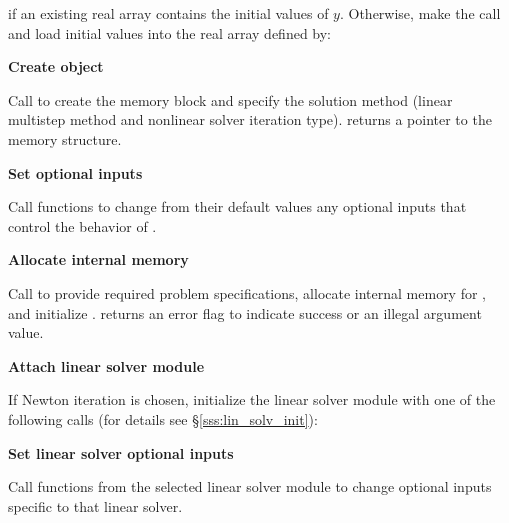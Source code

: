 \begin{Steps}
  {\s} 

  {\p} 

  if an existing real array  contains the initial values of $y$.  
  Otherwise, make the call  and load 
  initial values into the real array defined by:

  {\s} 

  {\p} 
  
\item\label{i:cvode_create} 
  {\bf Create {\cvode} object}

  Call  
  to create the {\cvode} memory block and specify the solution method
  (linear multistep method and nonlinear solver iteration type).
   returns a pointer to the {\cvode} memory structure.

\item
  {\bf Set optional inputs}

  Call  functions to change from their default values any
  optional inputs that control the behavior of {\cvode}.

\item\label{i:cvode_malloc} 
  {\bf Allocate internal memory}

  Call  
  to provide required problem specifications,
  allocate internal memory for {\cvode}, 
  and initialize {\cvode}.
   returns an error flag to indicate success or an illegal argument value.
  
\item\label{i:lin_solver} 
  {\bf Attach linear solver module}

  If Newton iteration is chosen, initialize the linear solver module
  with one of the following calls (for details see \S\ref{sss:lin_solv_init}):

  {\s} 

  {\s} 


  
\item
  {\bf Set linear solver optional inputs}

  Call  functions from the selected linear solver module to
  change optional inputs specific to that linear solver.


\end{Steps}
